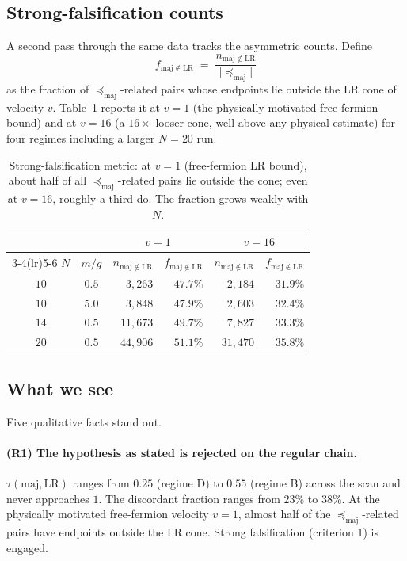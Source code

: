 \documentclass[11pt,a4paper]{article}
\theoremstyle{definition}
\theoremstyle{plain}
\theoremstyle{remark}
\newcommand{\abs}[1]{\lvert #1 \rvert}
\newcommand{\maj}{\mathrm{maj}}
\newcommand{\LR}{\mathrm{LR}}
\begin{document}
\subsection{Strong-falsification counts}

A second pass through the same data tracks the asymmetric counts.
Define
\begin{equation}\label{eq:fmaj}
  f_{\maj \notin \LR}
  \;=\;
  \frac{n_{\maj \notin \LR}}{\abs{\preceq_{\maj}}}
\end{equation}
as the fraction of $\preceq_{\maj}$-related pairs whose endpoints
lie outside the LR cone of velocity $v$.  Table~\ref{tab:strong}
reports it at $v = 1$ (the physically motivated free-fermion bound)
and at $v = 16$ (a $16\times$ looser cone, well above any physical
estimate) for four regimes including a larger $N = 20$ run.

\begin{table}[t]
\centering
\small
\renewcommand{\arraystretch}{1.05}
\begin{tabular}{ccrrrr}
\toprule
& & \multicolumn{2}{c}{$v = 1$} & \multicolumn{2}{c}{$v = 16$} \\
\cmidrule(lr){3-4}\cmidrule(lr){5-6}
$N$ & $m/g$ & $n_{\maj \notin \LR}$ & $f_{\maj \notin \LR}$
            & $n_{\maj \notin \LR}$ & $f_{\maj \notin \LR}$ \\
\midrule
$10$ & $0.5$  & $3{,}263$  & $47.7\%$ & $2{,}184$  & $31.9\%$ \\
$10$ & $5.0$  & $3{,}848$  & $47.9\%$ & $2{,}603$  & $32.4\%$ \\
$14$ & $0.5$  & $11{,}673$ & $49.7\%$ & $7{,}827$  & $33.3\%$ \\
$20$ & $0.5$  & $44{,}906$ & $51.1\%$ & $31{,}470$ & $35.8\%$ \\
\bottomrule
\end{tabular}
\caption{Strong-falsification metric: at $v = 1$ (free-fermion LR
bound), about half of all $\preceq_{\maj}$-related pairs lie outside
the cone; even at $v = 16$, roughly a third do.  The fraction grows
weakly with $N$.}
\label{tab:strong}
\end{table}

\subsection{What we see}

Five qualitative facts stand out.

\paragraph{(R1) The hypothesis as stated is rejected on the regular chain.}
$\tau(\maj, \LR)$ ranges from $0.25$ (regime D) to $0.55$ (regime B)
across the scan and never approaches $1$.  The discordant fraction
ranges from $23\%$ to $38\%$.  At the physically motivated free-fermion
velocity $v = 1$, almost half of the $\preceq_{\maj}$-related pairs
have endpoints outside the LR cone.  Strong falsification
(criterion 1) is engaged.
\end{document}
